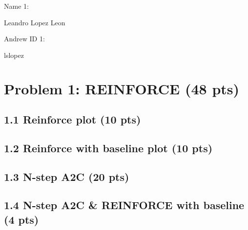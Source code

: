\documentclass[12pt]{article}
\begin{document}
Name 1: \begin{tcolorbox}[fit,height=1cm, width=5cm, blank, borderline={1pt}{1pt},nobeforeafter]
    \begin{center}
    \vspace{3mm}
    \large{Leandro Lopez Leon}
    \end{center}
\end{tcolorbox}
Andrew ID 1: \begin{tcolorbox}[fit,height=1cm, width=5cm, blank, borderline={1pt}{1pt},nobeforeafter]
    \begin{center}
    \vspace{3mm}
    \large{lslopez}
    \end{center}
\end{tcolorbox}

\newpage
\section*{Problem 1: REINFORCE (48 pts)}

\subsection*{1.1 Reinforce plot (10 pts)}
\begin{solution}[height=9cm]
\end{solution}

\subsection*{1.2 Reinforce with baseline plot (10 pts)}
\begin{solution}[height=9cm]
\end{solution}

\subsection*{1.3 N-step A2C (20 pts)}
\begin{solution}[height=20cm]
\end{solution}

\subsection*{1.4 N-step A2C \& REINFORCE with baseline (4 pts)}
\begin{solution}[height=5cm]
\end{solution}
\end{document}
